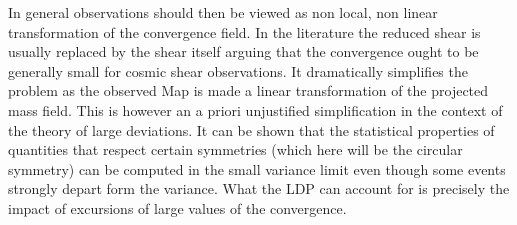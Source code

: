 \documentclass[twocolumn,aps,reprint, nofootinbib]{revtex4}
\begin{document}
In general observations should then be viewed as non local, non linear transformation of the convergence field. In the literature the reduced shear is usually replaced by the shear itself arguing that the convergence ought to be generally small for cosmic shear observations. It dramatically simplifies the problem as the observed Map is made a linear transformation of the projected mass field. This is however an a priori unjustified simplification in the context of the theory of large deviations. It can be shown that the statistical properties of quantities that respect certain symmetries (which here will be the circular symmetry) can be computed in the small variance limit even though some events strongly depart form the variance. What the LDP can account for is precisely the impact  of excursions of large values of the convergence. 
\end{document}
